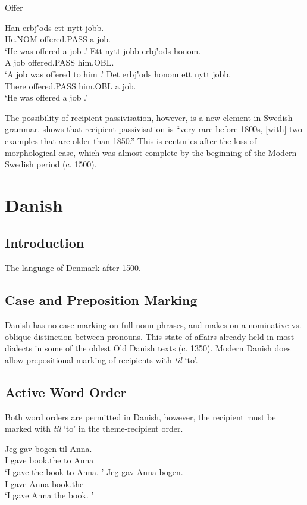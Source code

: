 \begin{exe}
\ex Offer
\begin{xlist}
\ex \gll Han erbj\''{o}ds ett nytt jobb.\\
He.NOM offered.PASS a job.\\
\trans `He was offered a job \citep{Anward.1989,Falk.1990,Lundquist.2006}.'
\ex \gll Ett nytt jobb erbj\''{o}ds honom.\\
A job offered.PASS him.OBL.\\
\trans `A job was offered to him \citep{Anward.1989,Falk.1990,Lundquist.2006}.'
\ex \gll Det erbj\''{o}ds honom ett nytt jobb.\\
There offered.PASS him.OBL a job.\\
\trans `He was offered a job \citep{Anward.1989,Falk.1990,Lundquist.2006}.'
\end{xlist}

The possibility of recipient passivisation, however, is a new element in Swedish grammar. \cite{Falk.1997} shows that recipient passivisation is ``very rare before 1800s, [with] two examples that are older than 1850.'' This is centuries after the loss of morphological case, which was almost complete by the beginning of the Modern Swedish period (c. 1500).

\section{Danish}\label{sec:Danish}
\subsection{Introduction}
The language of Denmark after 1500.
\subsection{Case and Preposition Marking}
Danish has no case marking on full noun phrases, and makes on a nominative vs. oblique distinction between pronouns. This state of affairs already held in most dialects in some of the oldest Old Danish texts (c. 1350). Modern Danish does allow prepositional marking of recipients with \emph{til} `to'.
\subsection{Active Word Order}
Both word orders are permitted in Danish, however, the recipient must be marked with \emph{til} `to' in the theme-recipient order.
\begin{exe}
\ex \gll Jeg gav bogen til Anna.\\
I gave book.the to Anna\\
\trans `I gave the book to Anna. \cite{Holmberg.1998}'
\ex \gll Jeg gav Anna bogen.\\
I gave Anna book.the\\
\trans `I gave Anna the book. \cite{Holmberg.1998}'
\end{exe}

\end{exe}
